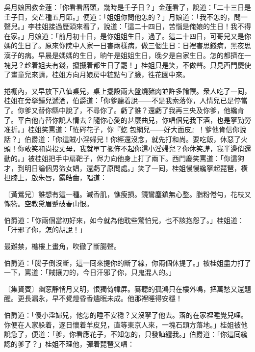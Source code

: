 吳月娘因教金蓮：「你看看曆頭，幾時是壬子日？」金蓮看了，說道：「二十三日是壬子日，交芒種五月節。」便道：「姐姐你問他怎的？」月娘道：「我不怎的，問一聲兒。」李桂姐接過歷頭來看了，說道：「這二十四日，苦惱是俺娘的生日！{}我不得在家。」月娘道：「前月初十日，是你姐姐生日，過了。這二十四日，可哥兒又是你媽的生日了。原來你院中人家一日害兩樣病，做三個生日：日裡害思錢病，黑夜思漢子的病。早晨是媽媽的生日，晌午是姐姐生日，晚夕是自家生日。怎的都擠在一塊兒？趁着姐夫有錢，攛掇着都生日了罷！」桂姐只是笑，不做聲。只見西門慶使了畫童兒來請，桂姐方向月娘房中粧點勻了臉，徃花園中來。

捲棚內，又早放下八仙桌兒，桌上擺設兩大盤燒豬肉並許多餚饌。衆人吃了一囘，桂姐在旁拏鍾兒遞酒，伯爵道：「你爹聽着說——不是我索落你，人情兒已是停當了。你爹又替你縣中說了，不尋你了。虧了誰？還虧了我再三央及你爹，他纔肯了。平白他肯替你說人情去？{}隨你心愛的甚麼曲兒，你唱個兒我下酒，也是拏勤勞准折。」桂姐笑罵道：「恠硶花子，你『虼𧒮包網兒——好大面皮』！爹他肯信你說話？」伯爵道：「你這賊小淫婦兒！你經還沒念，就先打和尚。要吃飯，休惡了火頭！你敢笑和尚投丈母，我就單丁擺佈不起你這小淫婦兒？你休笑譁，我半邊俏還動的。」被桂姐把手中扇靶子，侭力向他身上打了兩下。西門慶笑罵道：「你這狗才，到明日論個男盜女娼，還虧了原問處。」笑了一囘，桂姐慢慢纔拏起琵琶，橫担膝上，啟朱唇，露皓齒，唱道：

\begin{myquote} 
{\markfont\small〔黃鶯兒〕}誰想有這一種。減香肌，憔瘦損。鏡鸞塵鎖無心整。脂粉倦勻，花枝又懶簪。空教黛眉蹙破春山恨。
\end{myquote} 

伯爵道：「你兩個當初好來，如今就為他耽些驚怕兒，也不該抱怨了。」桂姐道：「汗邪了你，怎的胡說！」

\begin{myquote} 
最難禁，樵樓上畫角，吹徹了斷腸聲。
\end{myquote} 

伯爵道：「腸子倒沒斷，這一囘來提你的斷了線，你兩個休提了。」被桂姐盡力打了一下，罵道：「賊攘刀的，今日汗邪了你，只鬼混人的。」

\begin{myquote} 
{\markfont\small〔集資賓〕}幽窓靜悄月又明，恨獨倚幃屏。驀聽的孤鴻只在樓外鳴，把萬愁又還題醒。更長漏永，早不覺燈昏香燼眠未成。他那裡睡得安穩！
\end{myquote} 

伯爵道：「傻小淫婦兒，他怎的睡不安穩？又沒拏了他去。落的在家裡睡覺兒哩。你便在人家躲着，逐日懷着羊皮兒，直等東京人來，一塊石頭方落地。」桂姐被他說急了，便道：「爹，你看應花子，不知怎的，只發訕纏我。」伯爵道：「你這囘纔認的爹了？」{}桂姐不理他，彈着琵琶又唱：

